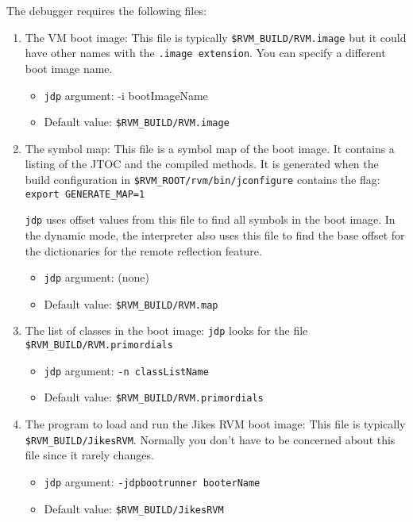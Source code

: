 The debugger requires the following files:

\begin{enumerate}
\item The VM boot image:
   This file is typically {\tt \$RVM\_BUILD/RVM.image} but it could
   have other names with the {\tt .image extension}.  You can specify a
   different boot image name.
\begin{itemize}
\item    {\tt jdp} argument:    {-i bootImageName}
\item   Default value:          {\tt \$RVM\_BUILD/RVM.image}
\end{itemize}

\item The symbol map:
   This file is a symbol map of the boot image.  It contains a listing of the 
   JTOC and the compiled methods.  It is generated when the build configuration 
   in {\tt \$RVM\_ROOT/rvm/bin/jconfigure} contains the flag:
        {\tt export GENERATE\_MAP=1}

   {\tt jdp} uses offset 
   values from this file to find all symbols in the boot image.
   In the dynamic mode, the interpreter also uses this file to find the base 
   offset for the dictionaries for the remote reflection feature.
\begin{itemize}
\item   {\tt jdp} argument:     (none)
\item    Default value: {\tt \$RVM\_BUILD/RVM.map}
\end{itemize}

\item The list of classes in the boot image:
   {\tt jdp} looks for the file {\tt \$RVM\_BUILD/RVM.primordials}

\begin{itemize}
\item   {\tt jdp} argument:     {\tt -n classListName}
\item   Default value:  {\tt \$RVM\_BUILD/RVM.primordials}
\end{itemize}

\item The program to load and run the Jikes RVM boot image:
   This file is typically {\tt \$RVM\_BUILD/JikesRVM}.
   Normally you don't have to be concerned about this file since it rarely
   changes.
\begin{itemize}
\item   {\tt jdp} argument:     {\tt -jdpbootrunner booterName}
\item   Default value:  {\tt \$RVM\_BUILD/JikesRVM}
\end{itemize}
\end{enumerate}

